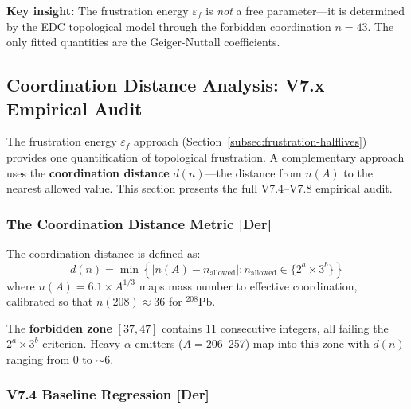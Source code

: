 \textbf{Key insight:} The frustration energy $\varepsilon_f$ is \emph{not} a free parameter—it is determined by the EDC topological model through the forbidden coordination $n = 43$. The only fitted quantities are the Geiger-Nuttall coefficients.

\subsection{Coordination Distance Analysis: V7.x Empirical Audit}
\label{subsec:v7-audit}

The frustration energy $\varepsilon_f$ approach (Section~\ref{subsec:frustration-halflives}) provides one quantification of topological frustration. A complementary approach uses the \textbf{coordination distance} $d(n)$---the distance from $n(A)$ to the nearest allowed value. This section presents the full V7.4--V7.8 empirical audit.

\subsubsection{The Coordination Distance Metric [Der]}
\label{subsubsec:dn-metric}

The coordination distance is defined as:
\begin{equation}
    d(n) = \min \left\{ |n(A) - n_{\text{allowed}}| : n_{\text{allowed}} \in \{2^a \times 3^b\} \right\}
    \label{eq:d-n-definition}
\end{equation}
where $n(A) = 6.1 \times A^{1/3}$ maps mass number to effective coordination, calibrated so that $n(208) \approx 36$ for $^{208}$Pb.

The \textbf{forbidden zone} $[37, 47]$ contains 11 consecutive integers, all failing the $2^a \times 3^b$ criterion. Heavy $\alpha$-emitters ($A = 206$--257) map into this zone with $d(n)$ ranging from 0 to $\sim 6$.

\subsubsection{V7.4 Baseline Regression [Der]}
\label{subsubsec:v74-regression}


